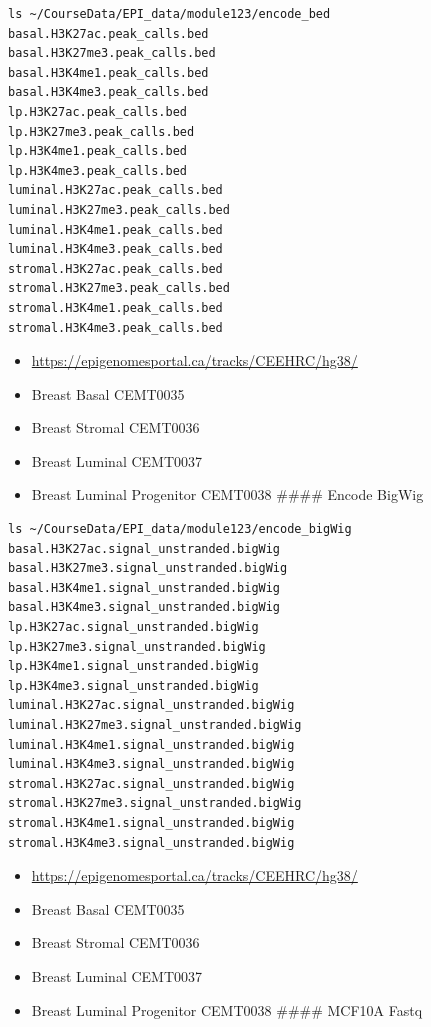 \documentclass[
]{book}
\providecommand{\tightlist}{%
  \setlength{\itemsep}{0pt}\setlength{\parskip}{0pt}}
\begin{document}
\begin{verbatim}
ls ~/CourseData/EPI_data/module123/encode_bed
basal.H3K27ac.peak_calls.bed
basal.H3K27me3.peak_calls.bed
basal.H3K4me1.peak_calls.bed
basal.H3K4me3.peak_calls.bed
lp.H3K27ac.peak_calls.bed
lp.H3K27me3.peak_calls.bed
lp.H3K4me1.peak_calls.bed
lp.H3K4me3.peak_calls.bed
luminal.H3K27ac.peak_calls.bed
luminal.H3K27me3.peak_calls.bed
luminal.H3K4me1.peak_calls.bed
luminal.H3K4me3.peak_calls.bed
stromal.H3K27ac.peak_calls.bed
stromal.H3K27me3.peak_calls.bed
stromal.H3K4me1.peak_calls.bed
stromal.H3K4me3.peak_calls.bed
\end{verbatim}

\begin{itemize}
\tightlist
\item
  \url{https://epigenomesportal.ca/tracks/CEEHRC/hg38/}
\item
  Breast Basal CEMT0035
\item
  Breast Stromal CEMT0036
\item
  Breast Luminal CEMT0037
\item
  Breast Luminal Progenitor CEMT0038
  \#\#\#\# Encode BigWig
\end{itemize}

\begin{verbatim}
ls ~/CourseData/EPI_data/module123/encode_bigWig
basal.H3K27ac.signal_unstranded.bigWig
basal.H3K27me3.signal_unstranded.bigWig
basal.H3K4me1.signal_unstranded.bigWig
basal.H3K4me3.signal_unstranded.bigWig
lp.H3K27ac.signal_unstranded.bigWig
lp.H3K27me3.signal_unstranded.bigWig
lp.H3K4me1.signal_unstranded.bigWig
lp.H3K4me3.signal_unstranded.bigWig
luminal.H3K27ac.signal_unstranded.bigWig
luminal.H3K27me3.signal_unstranded.bigWig
luminal.H3K4me1.signal_unstranded.bigWig
luminal.H3K4me3.signal_unstranded.bigWig
stromal.H3K27ac.signal_unstranded.bigWig
stromal.H3K27me3.signal_unstranded.bigWig
stromal.H3K4me1.signal_unstranded.bigWig
stromal.H3K4me3.signal_unstranded.bigWig
\end{verbatim}

\begin{itemize}
\tightlist
\item
  \url{https://epigenomesportal.ca/tracks/CEEHRC/hg38/}
\item
  Breast Basal CEMT0035
\item
  Breast Stromal CEMT0036
\item
  Breast Luminal CEMT0037
\item
  Breast Luminal Progenitor CEMT0038
  \#\#\#\# MCF10A Fastq
\end{itemize}
\end{document}
